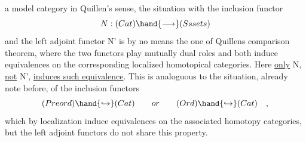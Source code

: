 a model category in Quillen's sense,  the situation with the inclusion
functor
\[ N:(Cat)\hand{\longrightarrow} (Ss sets) \]
and the left adjoint functor N'  is by no means the one of Quillens
comparison theorem,  where the two functors play mutually dual roles
and both induce equivalences on the corresponding localized homotopical
categories.  Here \uline{only} N,  \uline{not} N',  \uline{induces such equivalence}.  This is
analoguous to the situation,  already note before,  of the inclusion
functors
\[ (Preord)\hand{\hookrightarrow} (Cat) \qquad or \qquad (Ord)\hand{\hookrightarrow} (Cat) \quad , \]
which \inserted{[presumably]} by localization induce equivalences on the associated homotopy
categories,  but the left adjoint functors do not share this property.

